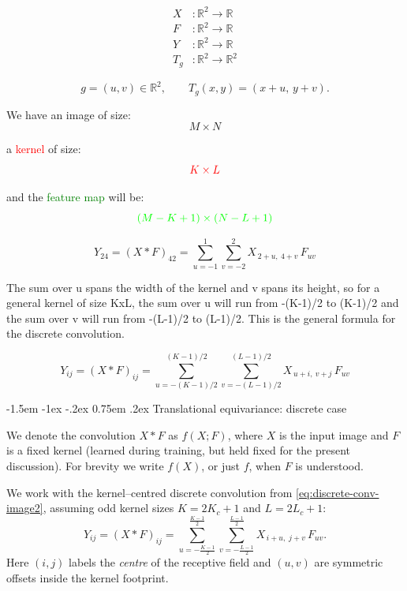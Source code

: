 \documentclass[12pt]{article}
\makeatletter
\renewcommand\subsection{\@startsection{subsection}{2}{\z@}%
                                     {-1.5em \@plus -1ex \@minus -.2ex}%
                                     {0.75em \@plus .2ex}%
                                     {\normalfont\large\bfseries}}
\makeatother
\begin{document}
\begin{equation}
  \label{eq:function-maps-cont}
  \begin{aligned}
      X   &: \mathbb{R}^2 \rightarrow \mathbb{R} \\
      F   &: \mathbb{R}^2 \rightarrow \mathbb{R} \\
      Y   &: \mathbb{R}^2 \rightarrow \mathbb{R} \\
      T_g &: \mathbb{R}^2 \rightarrow \mathbb{R}^2
  \end{aligned}
\end{equation}

\[
g = (u,v) \in \mathbb{R}^2,
\qquad
T_g(x,y) = (x+u,\, y+v).
\]


We have an image of size:
\[
M \times N
\]

a \textcolor{red}{kernel} of size:
\[
\textcolor{red}{K \times L}
\]

and the \textcolor{green}{feature map} will be:
\[
\textcolor{green}{(M-K+1) \times (N-L+1)}
\]



\begin{equation}
  \label{eq:discrete-conv-image1}
  Y_{2 4} = (X * F)_{4 2} =
  \sum_{u = -1}^{1}
  \sum_{v = -2}^{2}
  X_{\,2+u,\ 4+v}\, F_{u v}
  \end{equation}

The sum over u spans the width of the kernel and v spans its height, so for a general kernel of size KxL, the sum over u will run from -(K-1)/2 to (K-1)/2 and the sum over v will run from -(L-1)/2 to (L-1)/2. This is the general formula for the discrete convolution.

\begin{equation}
  \label{eq:discrete-conv-image2}
  Y_{i j} = (X * F)_{i j} =
  \sum_{u = -(K-1)/2}^{(K-1)/2}
  \sum_{v = -(L-1)/2}^{(L-1)/2}
  X_{\,u+i,\ v+j}\, F_{u v}
  \end{equation}

  \subsection{Translational equivariance: discrete case}

  We denote the convolution $X * F$ as $f(X;F)$, where $X$ is the input
  image and $F$ is a fixed kernel (learned during training, but held fixed
  for the present discussion).  For brevity we write $f(X)$, or just $f$,
  when $F$ is understood.
  
  We work with the kernel--centred discrete convolution from
  \eqref{eq:discrete-conv-image2}, assuming odd kernel sizes
  $K = 2K_c + 1$ and $L = 2L_c + 1$:
  \begin{equation}
    \label{eq:discrete-conv-centred-again}
    Y_{ij} = (X * F)_{ij}
    =
    \sum_{u = -\frac{K-1}{2}}^{\frac{K-1}{2}}
    \sum_{v = -\frac{L-1}{2}}^{\frac{L-1}{2}}
    X_{\,i+u,\; j+v}\, F_{uv}.
  \end{equation}
  Here $(i,j)$ labels the \emph{centre} of the receptive field and
  $(u,v)$ are symmetric offsets inside the kernel footprint.
  
\end{document}
